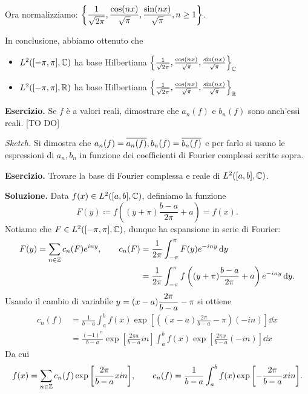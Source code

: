 Ora normalizziamo: $\displaystyle \left\{ \frac{1}{\sqrt{2\pi}}, \frac{\cos(nx)}{\sqrt{\pi}}, \frac{\sin(nx)}{\sqrt{\pi}}, n \geq 1 \right\}$.

In conclusione, abbiamo ottenuto che
\begin{itemize}

	\item $L^2( [-\pi,\pi], \mathbb C)$ ha base Hilbertiana $\left\{ \frac{1}{\sqrt{2\pi}}, \frac{\cos(nx)}{\sqrt{\pi}}, \frac{\sin(nx)}{\sqrt{\pi}} \right\}_{\mathbb C}$


	\item $L^2( [-\pi,\pi], \mathbb R)$ ha base Hilbertiana $\left\{ \frac{1}{\sqrt{2\pi}}, \frac{\cos(nx)}{\sqrt{\pi}}, \frac{\sin(nx)}{\sqrt{\pi}} \right\}_{\mathbb R}$ 

\end{itemize}

\textbf{Esercizio.}  Se $f$ è a valori reali, dimostrare che $a_n(f)$ e $b_n(f)$ sono anch'essi reali. [TO DO]

\textit{Sketch.} Si dimostra che $a_n(f) = \overline{a_n(f)}, b_n(f) = \overline{b_n(f)}$ e per farlo si usano le espressioni di $a_n, b_n$ in funzione dei coefficienti di Fourier complessi scritte sopra.


\textbf{Esercizio.} Trovare la base di Fourier complessa e reale di $L^2([a,b], \mathbb C) $.

\textbf{Soluzione.}
Data $f(x) \in L^2([a,b],\mathbb C)$, definiamo la funzione
%
$$
	F(y) \coloneqq  f\left( (y+\pi)\frac{b-a}{2\pi} + a \right) = f(x).
$$
%
Notiamo che $F \in L^2([-\pi,\pi],\mathbb C)$, dunque ha espansione in serie di Fourier:
%
\begin{align*}
	F(y) = \sum_{n \in \mathbb Z} c_n(F) e^{iny}, \qquad 
	c_n(F) & = \frac{1}{2\pi} \int_{-\pi}^\pi F(y) e^{-iny} \,\mathrm{d} y \\
	& = \frac{1}{2\pi} \int_{-\pi}^\pi f \left( (y+ \pi) \frac{b-a}{2\pi} + a \right) e^{-iny} \,\mathrm{d} y.
\end{align*}
Usando il cambio di variabile $\displaystyle y = (x-a) \frac{2\pi}{b-a} - \pi$ si ottiene
\begin{align*}
	c_n(f) & = \frac{1}{b-a} \int_a^b f(x) \exp{\left[ \left((x-a)\frac{2\pi}{b-a} - \pi\right)(-in)\right]} \dd x \\
	& = \frac{(-1)^n}{b-a}\exp{\left[ \frac{2\pi a}{b-a} in \right]} \int_a^b f(x) \exp{\left[ \frac{2\pi x}{b-a} (-in) \right]} \dd x 
\end{align*}
Da cui
%
$$
	f(x) = \sum_{n \in \mathbb Z} c_n(f) \exp{\left[ \frac{2\pi}{b-a}x in \right]}, \qquad 
	c_n(f) = \frac{1}{b-a} \int_a^b f(x) \exp{\left[- \frac{2\pi}{b-a}x in \right]}.
$$
%






